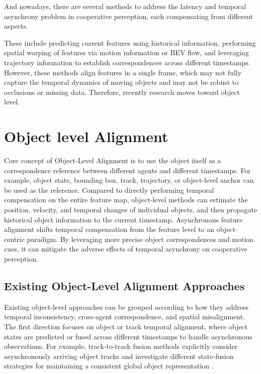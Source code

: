 \documentclass[12pt, a4paper, twoside]{article}
\begin{document}
And nowadays, there are several methods to address the latency and temporal asynchrony problem in cooperative perception, each compensating from different aspects.\cite{wei2023asynchrony,song2025traf,du2025rcpbench,yazgan2025efficomm,yazgan2025slimcomm,li2026coanchor}

These include predicting current features using historical information, performing spatial warping of features via motion information or BEV flow, and leveraging trajectory information to establish correspondences across different timestamps.
However, these methods align features in a single frame, which may not fully capture the temporal dynamics of moving objects and may not be robust to occlusions or missing data.
Therefore, recently research moves toward object level.

\section{Object level Alignment}

Core concept of Object-Level Alignment is to use the object itself as a correspondence reference between different agents and different timestamps.
For example, object state, bounding box, track, trajectory, or object-level anchor can be used as the reference.
Compared to directly performing temporal compensation on the entire feature map, object-level methods can estimate the position, velocity, and temporal changes of individual objects, and then propagate historical object information to the current timestamp.
Asynchronous feature alignment shifts temporal compensation from the feature level to an object-centric paradigm. 
By leveraging more precise object correspondences and motion cues, it can mitigate the adverse effects of temporal asynchrony on cooperative perception.

\subsection{Existing Object-Level Alignment Approaches}
Existing object-level approaches can be grouped according to how they address temporal inconsistency, cross-agent correspondence, and spatial misalignment. 
The first direction focuses on object or track temporal alignment, where object states are predicted or fused across different timestamps to handle asynchronous observations. 
For example, track-to-track fusion methods explicitly consider asynchronously arriving object tracks and investigate different state-fusion strategies for maintaining a consistent global object representation \cite{castelino2026track}.
\end{document}
